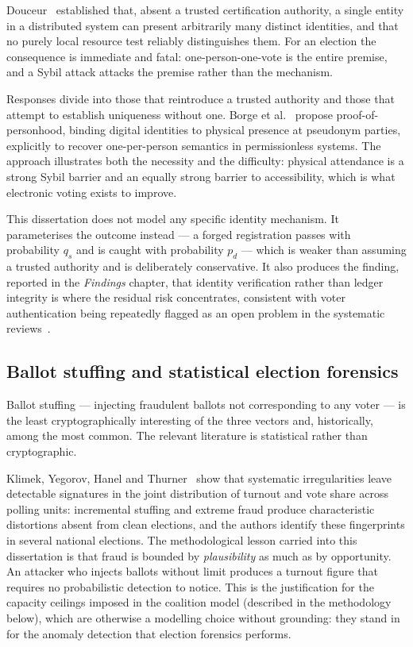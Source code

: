 Douceur~\cite{douceur2002} established that, absent a trusted
certification authority, a single entity in a distributed system can
present arbitrarily many distinct identities, and that no purely local
resource test reliably distinguishes them. For an election the
consequence is immediate and fatal: one-person-one-vote is the entire
premise, and a Sybil attack attacks the premise rather than the
mechanism.

Responses divide into those that reintroduce a trusted authority and
those that attempt to establish uniqueness without one. Borge et
al.~\cite{borge2017} propose proof-of-personhood, binding digital
identities to physical presence at pseudonym parties, explicitly to
recover one-per-person semantics in permissionless systems. The
approach illustrates both the necessity and the difficulty: physical
attendance is a strong Sybil barrier and an equally strong barrier to
accessibility, which is what electronic voting exists to improve.

This dissertation does not model any specific identity mechanism. It
parameterises the outcome instead --- a forged registration passes with
probability $q_s$ and is caught with probability $p_d$ --- which is
weaker than assuming a trusted authority and is deliberately
conservative. It also produces the finding, reported in the \emph{Findings} chapter, that identity verification rather than
ledger integrity is where the residual risk concentrates, consistent
with voter authentication being repeatedly flagged as an open problem in
the systematic reviews~\cite{ohize2025,rahul2025}.

\subsection{Ballot stuffing and statistical election forensics}
\label{sec:lit-forensics}

Ballot stuffing --- injecting fraudulent ballots not corresponding to
any voter --- is the least cryptographically interesting of the three
vectors and, historically, among the most common. The relevant
literature is statistical rather than cryptographic.

Klimek, Yegorov, Hanel and Thurner~\cite{klimek2012} show that
systematic irregularities leave detectable signatures in the joint
distribution of turnout and vote share across polling units: incremental
stuffing and extreme fraud produce characteristic distortions absent
from clean elections, and the authors identify these fingerprints in
several national elections. The methodological lesson carried into this
dissertation is that fraud is bounded by \emph{plausibility} as much as
by opportunity. An attacker who injects ballots without limit produces a
turnout figure that requires no probabilistic detection to notice. This
is the justification for the capacity ceilings imposed in the coalition
model (described in the methodology below), which are otherwise a
modelling choice without grounding: they stand in for the anomaly
detection that election forensics performs.

